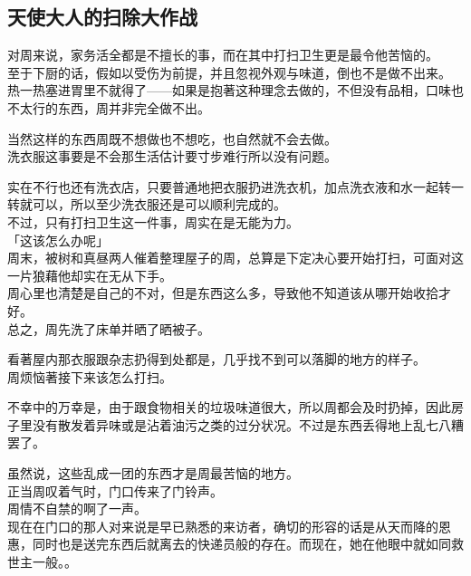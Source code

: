 \subsection{天使大人的扫除大作战}

对周来说，家务活全都是不擅长的事，而在其中打扫卫生更是最令他苦恼的。\\%

至于下厨的话，假如以受伤为前提，并且忽视外观与味道，倒也不是做不出来。\\

热一热塞进胃里不就得了——如果是抱著这种理念去做的，不但没有品相，口味也不太行的东西，周并非完全做不出。

当然这样的东西周既不想做也不想吃，也自然就不会去做。\\

洗衣服这事要是不会那生活估计要寸步难行所以没有问题。

实在不行也还有洗衣店，只要普通地把衣服扔进洗衣机，加点洗衣液和水一起转一转就可以，所以至少洗衣服还是可以顺利完成的。\\

不过，只有打扫卫生这一件事，周实在是无能为力。\\

「这该怎么办呢」\\

周末，被树和真昼两人催着整理屋子的周，总算是下定决心要开始打扫，可面对这一片狼藉他却实在无从下手。\\

周心里也清楚是自己的不对，但是东西这么多，导致他不知道该从哪开始收拾才好。\\

总之，周先洗了床单并晒了晒被子。

看著屋内那衣服跟杂志扔得到处都是，几乎找不到可以落脚的地方的样子。\\

周烦恼著接下来该怎么打扫。

不幸中的万幸是，由于跟食物相关的垃圾味道很大，所以周都会及时扔掉，因此房子里没有散发着异味或是沾着油污之类的过分状况。不过是东西丢得地上乱七八糟罢了。

虽然说，这些乱成一团的东西才是周最苦恼的地方。\\

正当周叹着气时，门口传来了门铃声。\\

周情不自禁的啊了一声。\\

现在在门口的那人对来说是早已熟悉的来访者，确切的形容的话是从天而降的恩惠，同时也是送完东西后就离去的快递员般的存在。而现在，她在他眼中就如同救世主一般。。\\ %

